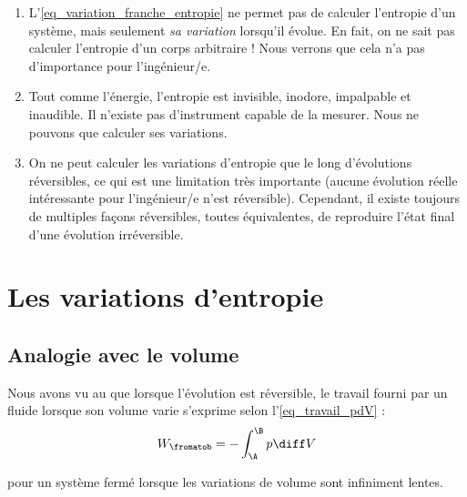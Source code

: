 			\begin{enumerate}
			
				\item L’\cref{eq_variation_franche_entropie} ne permet pas de calculer l’entropie d’un système, mais seulement \emph{sa variation} lorsqu’il évolue. En fait, on ne sait pas calculer l’entropie d’un corps arbitraire ! Nous verrons que cela n’a pas d’importance pour l’ingénieur/e.
		
				\item Tout comme l’énergie, l’entropie est invisible, inodore, impalpable et inaudible. Il n’existe pas d’instrument capable de la mesurer. Nous ne pouvons que calculer ses variations.

				\item On ne peut calculer les variations d’entropie que le long d’évolutions réversibles, ce qui est une limitation très importante (aucune évolution réelle intéressante pour l’ingénieur/e n’est réversible). Cependant, il existe toujours de multiples façons réversibles, toutes équivalentes, de reproduire l’état final d’une évolution irréversible.
				
			\end{enumerate}
			

\section{Les variations d’entropie}
\label{ch_variations_entropie}

	\subsection{Analogie avec le volume}
	
		Nous avons vu au \coursdeux que lorsque l’évolution est réversible, le travail fourni par un fluide lorsque son volume varie s’exprime selon l’\cref{eq_travail_pdV} :
		\begin{equation}
			W_\fromatob = -\int_\A^\B p \diff V
		\end{equation}
		\begin{equationterms}
			\item pour un système fermé lorsque les variations de volume sont infiniment lentes.
		\end{equationterms}

